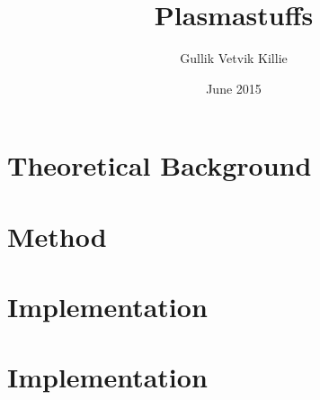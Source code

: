 \documentclass[x11names,twoside,english]{uiofysmaster}
\author{Gullik Vetvik Killie}
\title{Plasmastuffs}
\date{June 2015}
\begin{document}
% 
%
\tableofcontents
% 
%     

%     
%
\chapter{Theoretical Background}
    
    
    
    
    
    
    
    
\chapter{Method}
    
    
    
    
    
    
    
    

\chapter{Implementation}
    
    
    
    
%
\chapter{Implementation}
    
    
    
    
	
%
\end{document}
